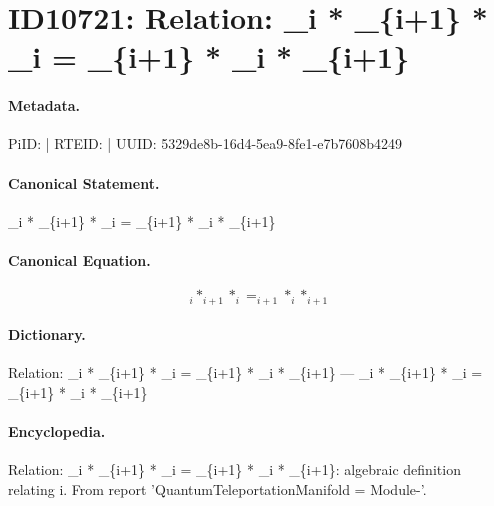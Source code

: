 \section*{ID10721: Relation: \_i * \_\{i+1\} * \_i = \_\{i+1\} * \_i * \_\{i+1\}}
\paragraph{Metadata.}
PiID:  | RTEID:  | UUID: 5329de8b-16d4-5ea9-8fe1-e7b7608b4249

\paragraph{Canonical Statement.}
\_i * \_\{i+1\} * \_i = \_\{i+1\} * \_i * \_\{i+1\}

\paragraph{Canonical Equation.}
\[
_i * _{i+1} * _i = _{i+1} * _i * _{i+1}
\]

\paragraph{Dictionary.}
Relation: \_i * \_\{i+1\} * \_i = \_\{i+1\} * \_i * \_\{i+1\} — \_i * \_\{i+1\} * \_i = \_\{i+1\} * \_i * \_\{i+1\}

\paragraph{Encyclopedia.}
Relation: \_i * \_\{i+1\} * \_i = \_\{i+1\} * \_i * \_\{i+1\}: algebraic definition relating i. From report 'QuantumTeleportationManifold = Module-'.
